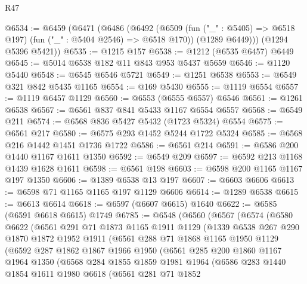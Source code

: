 \begin{lexlean}{R47}
\begin{coremodule}
@6534 := @6459
    (@6471
      (@6486
        (@6492
          (@6509 (fun ("_" : @5405) => @6518 @197) (fun ("_" : @5404 @2546) => @6518 @170))
          (@1289 @6449)))
      (@1294 @5396 @5421))
@6535 := @1215 @157
@6538 := @1212 (@6535 @6457) @6449
@6545 := @5014 @6538 @182 @11 @843 @953 @5437 @5659
@6546 := @1120 @5440
@6548 := @6545 @6546 @5721
@6549 := @1251 @6538
@6553 := @6549 @321 @842 @5435 @1165
@6554 := @169 @5430
@6555 := @1119 @6554
@6557 := @1119 @6457 @1129
@6560 := @6553 (@6555 @6557) @6546
@6561 := @1261 @6538
@6567 := @6561 @837 @841 @5433 @1167 @6554 @6557
@6568 := @6549 @211
@6574 := @6568 @836 @5427 @5432 (@1723 @5324) @6554
@6575 := @6561 @217
@6580 := @6575 @293 @1452 @5244 @1722 @5324
@6585 := @6568 @216 @1442 @1451 @1736 @1722
@6586 := @6561 @214
@6591 := @6586 @200 @1440 @1167 @1611 @1350
@6592 := @6549 @209
@6597 := @6592 @213 @1168 @1439 @1628 @1611
@6598 := @6561 @198
@6603 := @6598 @200 @1165 @1167 @197 @1350
@6606 := @1389 @6538 @13 @197
@6607 := @6603 @6606
@6613 := @6598 @71 @1165 @1165 @197 @1129 @6606
@6614 := @1289 @6538
@6615 := @6613 @6614
@6618 := @6597 (@6607 @6615) @1640
@6622 := @6585 (@6591 @6618 @6615) @1749
@6785 := @6548
    (@6560
      (@6567
        (@6574
          (@6580
            @6622
            (@6561
              @291
              @71
              @1873
              @1165
              @1911
              @1129
              (@1339
                @6538
                @267
                @290
                @1870
                @1872
                @1952
                @1911
                (@6561
                  @288
                  @71
                  @1868
                  @1165
                  @1950
                  @1129
                  (@6592
                    @287
                    @1862
                    @1867
                    @1966
                    @1950
                    (@6561
                      @285
                      @200
                      @1860
                      @1167
                      @1964
                      @1350
                      (@6568
                        @284
                        @1855
                        @1859
                        @1981
                        @1964
                        (@6586
                          @283
                          @1440
                          @1854
                          @1611
                          @1980
                          @6618
                          (@6561
                            @281
                            @71
                            @1852

\end{coremodule}
\end{lexlean}
